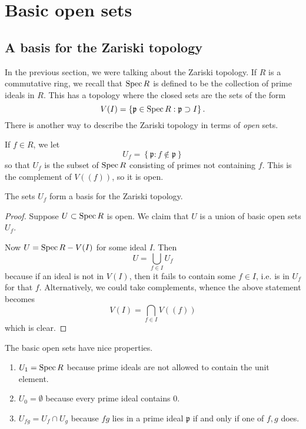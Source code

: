 \section{Basic open sets}

\subsection{A basis for the Zariski topology}
In the previous section, we were talking about the Zariski
topology. If $R$ is a
commutative ring, we recall that $\operatorname{Spec} R$ is defined to be the
collection of
prime ideals in $R$. This has a topology where the closed sets
are the sets of
the form
\[ V(I) = \left\{\mathfrak{p} \in \operatorname{Spec} R: \mathfrak{p} \supset
I\right\} . \]
There is another way to describe the Zariski topology in terms
of
\emph{open} sets.  

\begin{definition} 
If $f \in R$, we let 
\[ U_f = \left\{\mathfrak{p}: f \notin \mathfrak{p}\right\}  \]
so that $U_f$ is the subset of $\operatorname{Spec} R$ consisting of primes
not containing
$f$. This is the complement of $V((f))$, so it is open.  
\end{definition} 

\begin{proposition} 
The sets $U_f$ form a basis for the Zariski topology. 
\end{proposition} 

\begin{proof} 
Suppose $U \subset \operatorname{Spec} R$ is open. We claim that $U$ is a
union of basic
open sets $U_f$. 

Now $U = \operatorname{Spec} R - V(I)$ for some ideal $I$.  Then
\[ U = \bigcup_{f \in I} U_f  \]
because if an ideal is not in $V(I)$, then it fails to contain
some $f \in I$,
i.e. is in $U_f$ for that $f$. Alternatively, we could take
complements, whence
the above statement becomes
\[ V(I) = \bigcap_{f \in I} V((f))  \]
which is clear.
\end{proof} 

The basic open sets have nice properties.
\begin{enumerate}
\item $U_1 = \operatorname{Spec} R$ because prime ideals are not allowed to
contain the
unit element. 
\item $U_0 = \emptyset$ because every prime ideal contains $0$.
\item $U_{fg} = U_f \cap U_g$ because $fg$ lies in a prime ideal
$\mathfrak{p}$ if and only if one of $f,g$ does.
\end{enumerate}

